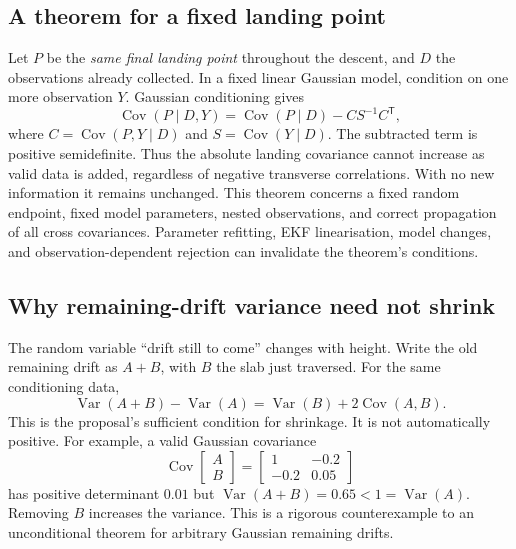 \documentclass[11pt,a4paper]{article}
\numberwithin{equation}{section}
\begin{document}
\subsection{A theorem for a fixed landing point}
Let $P$ be the \emph{same final landing point} throughout the descent, and $D$ the observations already collected. In a fixed linear Gaussian model, condition on one more observation $Y$. Gaussian conditioning gives
\begin{equation}
 \operatorname{Cov}(P\mid D,Y)
 =\operatorname{Cov}(P\mid D)-C S^{-1}C^{\mathsf T},
\end{equation}
where $C=\operatorname{Cov}(P,Y\mid D)$ and $S=\operatorname{Cov}(Y\mid D)$. The subtracted term is positive semidefinite. Thus the absolute landing covariance cannot increase as valid data is added, regardless of negative transverse correlations. With no new information it remains unchanged. This theorem concerns a fixed random endpoint, fixed model parameters, nested observations, and correct propagation of all cross covariances. Parameter refitting, EKF linearisation, model changes, and observation-dependent rejection can invalidate the theorem's conditions.

\subsection{Why remaining-drift variance need not shrink}
The random variable ``drift still to come'' changes with height. Write the old remaining drift as $A+B$, with $B$ the slab just traversed. For the same conditioning data,
\begin{equation}
 \operatorname{Var}(A+B)-\operatorname{Var}(A)
 =\operatorname{Var}(B)+2\operatorname{Cov}(A,B).
\end{equation}
This is the proposal's sufficient condition for shrinkage. It is not automatically positive. For example, a valid Gaussian covariance
\begin{equation}
 \operatorname{Cov}\begin{bmatrix}A\\B\end{bmatrix}
 =\begin{bmatrix}1&-0.2\\-0.2&0.05\end{bmatrix}
\end{equation}
has positive determinant $0.01$ but $\operatorname{Var}(A+B)=0.65<1=\operatorname{Var}(A)$. Removing $B$ increases the variance. This is a rigorous counterexample to an unconditional theorem for arbitrary Gaussian remaining drifts.
\end{document}
